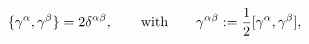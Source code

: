 \begin{equation}
\{\gamma^\alpha,\gamma^\beta\}=2\delta^{\alpha\beta},
\qquad\hbox{with}\qquad\gamma^{\alpha\beta}:={1\over 2}[\gamma^\alpha,\gamma^\beta],
\end{equation}

